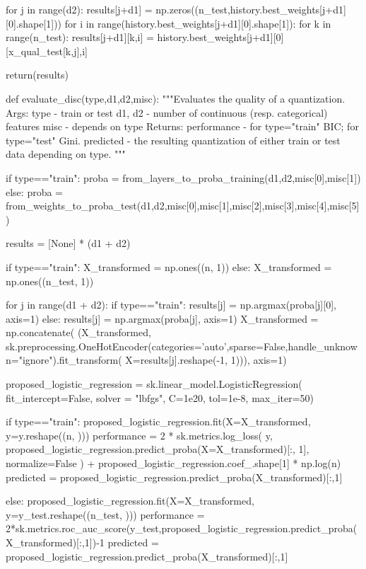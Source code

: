 \begin{pylisting}
        for j in range(d2):
            results[j+d1] = np.zeros((n_test,history.best_weights[j+d1][0].shape[1]))
            for i in range(history.best_weights[j+d1][0].shape[1]):
                for k in range(n_test):
                    results[j+d1][k,i] = history.best_weights[j+d1][0][x_qual_test[k,j],i]

        return(results)
    
    
    def evaluate_disc(type,d1,d2,misc):
        """Evaluates the quality of a quantization.
	    Args:
	       type - train or test
	       d1, d2 - number of continuous (resp. categorical) features
	       misc - depends on type
	    Returns:
		  performance - for type="train" BIC; for type="test" Gini.
		  predicted - the resulting quantization of either train or test data depending on type.
	    """

        if type=="train":
            proba = from_layers_to_proba_training(d1,d2,misc[0],misc[1])
        else:
            proba = from_weights_to_proba_test(d1,d2,misc[0],misc[1],misc[2],misc[3],misc[4],misc[5])


        results = [None] * (d1 + d2)

        if type=="train":
            X_transformed = np.ones((n, 1))
        else:
            X_transformed = np.ones((n_test, 1))

        for j in range(d1 + d2):
            if type=="train":
                results[j] = np.argmax(proba[j][0], axis=1)
            else:
                results[j] = np.argmax(proba[j], axis=1)
            X_transformed = np.concatenate(
                (X_transformed, sk.preprocessing.OneHotEncoder(categories='auto',sparse=False,handle_unknown="ignore").fit_transform(
                    X=results[j].reshape(-1, 1))),
                axis=1)

        proposed_logistic_regression = sk.linear_model.LogisticRegression(
            fit_intercept=False, solver = "lbfgs", C=1e20, tol=1e-8, max_iter=50)


        if type=="train":
            proposed_logistic_regression.fit(X=X_transformed, y=y.reshape((n, )))
            performance = 2 * sk.metrics.log_loss(
              y,
              proposed_logistic_regression.predict_proba(X=X_transformed)[:, 1],
              normalize=False
          ) + proposed_logistic_regression.coef_.shape[1] * np.log(n)
            predicted = proposed_logistic_regression.predict_proba(X_transformed)[:,1]

        else:
            proposed_logistic_regression.fit(X=X_transformed, y=y_test.reshape((n_test, )))
            performance = 2*sk.metrics.roc_auc_score(y_test,proposed_logistic_regression.predict_proba(X_transformed)[:,1])-1
            predicted = proposed_logistic_regression.predict_proba(X_transformed)[:,1]


\end{pylisting}
